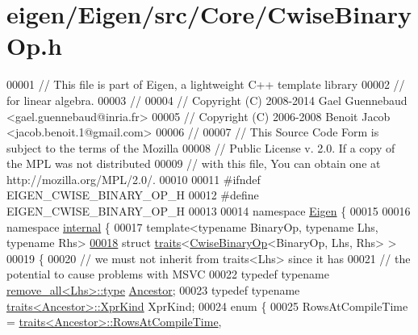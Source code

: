\hypertarget{eigen_2_eigen_2src_2_core_2_cwise_binary_op_8h_source}{}\section{eigen/\+Eigen/src/\+Core/\+Cwise\+Binary\+Op.h}
\label{eigen_2_eigen_2src_2_core_2_cwise_binary_op_8h_source}

\begin{DoxyCode}
00001 \textcolor{comment}{// This file is part of Eigen, a lightweight C++ template library}
00002 \textcolor{comment}{// for linear algebra.}
00003 \textcolor{comment}{//}
00004 \textcolor{comment}{// Copyright (C) 2008-2014 Gael Guennebaud <gael.guennebaud@inria.fr>}
00005 \textcolor{comment}{// Copyright (C) 2006-2008 Benoit Jacob <jacob.benoit.1@gmail.com>}
00006 \textcolor{comment}{//}
00007 \textcolor{comment}{// This Source Code Form is subject to the terms of the Mozilla}
00008 \textcolor{comment}{// Public License v. 2.0. If a copy of the MPL was not distributed}
00009 \textcolor{comment}{// with this file, You can obtain one at http://mozilla.org/MPL/2.0/.}
00010 
00011 \textcolor{preprocessor}{#ifndef EIGEN\_CWISE\_BINARY\_OP\_H}
00012 \textcolor{preprocessor}{#define EIGEN\_CWISE\_BINARY\_OP\_H}
00013 
00014 \textcolor{keyword}{namespace }\hyperlink{namespace_eigen}{Eigen} \{
00015 
00016 \textcolor{keyword}{namespace }\hyperlink{namespaceinternal}{internal} \{
00017 \textcolor{keyword}{template}<\textcolor{keyword}{typename} BinaryOp, \textcolor{keyword}{typename} Lhs, \textcolor{keyword}{typename} Rhs>
\hyperlink{struct_eigen_1_1internal_1_1traits_3_01_cwise_binary_op_3_01_binary_op_00_01_lhs_00_01_rhs_01_4_01_4}{00018} \textcolor{keyword}{struct }\hyperlink{struct_eigen_1_1internal_1_1traits}{traits}<\hyperlink{group___core___module_class_eigen_1_1_cwise_binary_op}{CwiseBinaryOp}<BinaryOp, Lhs, Rhs> >
00019 \{
00020   \textcolor{comment}{// we must not inherit from traits<Lhs> since it has}
00021   \textcolor{comment}{// the potential to cause problems with MSVC}
00022   \textcolor{keyword}{typedef} \textcolor{keyword}{typename} \hyperlink{group___sparse_core___module}{remove\_all<Lhs>::type} \hyperlink{group___sparse_core___module}{Ancestor};
00023   \textcolor{keyword}{typedef} \textcolor{keyword}{typename} \hyperlink{struct_eigen_1_1internal_1_1traits}{traits<Ancestor>::XprKind} XprKind;
00024   \textcolor{keyword}{enum} \{
00025     RowsAtCompileTime = \hyperlink{struct_eigen_1_1internal_1_1traits}{traits<Ancestor>::RowsAtCompileTime},

\end{DoxyCode}
